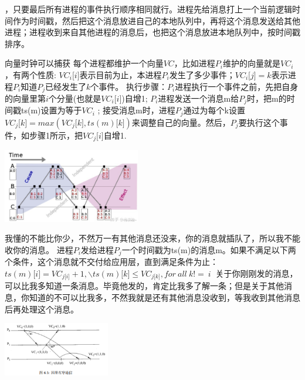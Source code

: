 \documentclass[twoside]{ctexart}
\begin{document}
\begin{multicols}{2}
   ，只要最后所有进程的事件执行顺序相同就行。进程先给消息打上一个当前逻辑时间作为时间戳，然后把这个消息放进自己的本地队列中，再将这个消息发送给其他进程；进程收到来自其他进程的消息后，也把这个消息放进本地队列中，按时间戳排序。

   向量时钟可以捕获 每个进程都维护一个向量\(VC\)，比如进程\(P_{i}\)维护的向量就是\(VC_{i}\)，有两个性质: \(VC_{i}\lbrack i\rbrack\)表示目前为止，本进程\(P_{i}\)发生了多少事件；\(VC_{i}\lbrack j\rbrack = k\)表示进程\(P_{i}\)知道\(P_{j}\)已经发生了\(k\)个事件。 执行步骤：\(P_{i}\)进程执行一个事件之前，先把自身的向量里第\(i\)个分量(也就是\(VC_{i}\lbrack i\rbrack\))自增1; \(P_{i}\)进程发送一个消息m给\(P_{j}\)时，把m的时间戳ts(m)设置为等于\(VC_{i}\) ; 接受消息m时，进程\(P_{j}\)通过为每个k设置\(VC_{j}\lbrack k\rbrack = max\left( VC_{j}\lbrack k\rbrack,ts(m)\lbrack k\rbrack \right)\)来调整自己的向量。然后，\(P_{j}\)要执行这个事件，如步骤1所示，把\(VC_{j}\lbrack i\rbrack\)自增1. 

\includegraphics[width=0.45\textwidth,keepaspectratio]{pics/vector.png}

   我懂的不能比你少，不然万一有其他消息还没来，你的消息就插队了，所以我不能收你的消息。  进程\(P_{i}\)发给进程\(P_{j}\)一个时间戳为ts(m)的消息m。如果不满足以下两个条件，这个消息就不交付给应用层，直到满足条件为止：\(ts(m)\lbrack i\rbrack = VC_{j\lbrack i\rbrack} + 1,\backslash ts(m)\lbrack k\rbrack \leq VC_{j\lbrack k\rbrack},for\ all\ k! = \ i\ \) 关于你刚刚发的消息，可以比我多知道一条消息。毕竟他发的，肯定比我多了解一条；但是关于其他消息，你知道的不可以比我多，不然我就是还有其他消息没收到，等我收到其他消息后再处理这个消息。

\includegraphics[width=0.35\textwidth,keepaspectratio]{pics/causally-ordered-multicasting.png}


\end{multicols}
\end{document}
